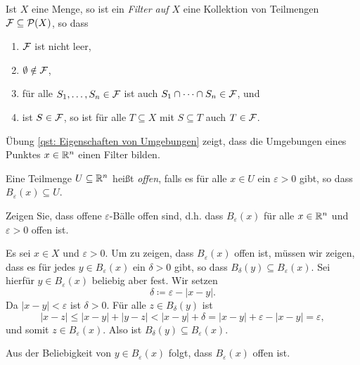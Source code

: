 \documentclass[a4paper,10pt]{article}
\begin{document}
\begin{bem}
 Ist $X$ eine Menge, so ist ein \emph{Filter auf $X$} eine Kollektion von Teilmengen $\mathcal{F} \subseteq \mathcal{P}(X)$, so dass
 \begin{enumerate}
  \item
   $\mathcal{F}$ ist nicht leer,
  \item
   $\emptyset \notin \mathcal{F}$,
  \item
   für alle $S_1, \dotsc, S_n \in \mathcal{F}$ ist auch $S_1 \cap \dotsb \cap S_n \in \mathcal{F}$, und
  \item
   ist $S \in \mathcal{F}$, so ist für alle $T \subseteq X$ mit $S \subseteq T$ auch $T \in \mathcal{F}$.
 \end{enumerate}
 Übung \ref{qst: Eigenschaften von Umgebungen} zeigt, dass die Umgebungen eines Punktes $x \in \mathbb{R}^n$ einen Filter bilden.
\end{bem}



\begin{defi}
 Eine Teilmenge $U \subseteq \mathbb{R}^n$ heißt \emph{offen}, falls es für alle $x \in U$ ein $\varepsilon > 0$ gibt, so dass $B_\varepsilon(x) \subseteq U$.
\end{defi}


\begin{question}
 Zeigen Sie, dass offene $\varepsilon$-Bälle offen sind, d.h. dass $B_\varepsilon(x)$ für alle $x \in \mathbb{R}^n$ und $\varepsilon > 0$ offen ist.
\end{question}
\begin{solution}
 Es sei $x \in X$ und $\varepsilon > 0$. Um zu zeigen, dass $B_\varepsilon(x)$ offen ist, müssen wir zeigen, dass es für jedes $y \in B_\varepsilon(x)$ ein $\delta > 0$ gibt, so dass $B_\delta(y) \subseteq B_\varepsilon(x)$. Sei hierfür $y \in B_\varepsilon(x)$ beliebig aber fest. Wir setzen
 \[
  \delta \coloneqq \varepsilon - |x-y|.
 \]
 Da $|x-y| < \varepsilon$ ist $\delta > 0$. Für alle $z \in B_\delta(y)$ ist
 \[
  |x-z|
  \leq |x-y| + |y-z|
  < |x-y| + \delta
  = |x-y| + \varepsilon - |x-y|
  = \varepsilon,
 \]
 und somit $z \in B_\varepsilon(x)$. Also ist $B_\delta(y) \subseteq B_\varepsilon(x)$. 
 \begin{center}
 \end{center}
 Aus der Beliebigkeit von $y \in B_\varepsilon(x)$ folgt, dass $B_\varepsilon(x)$ offen ist.
\end{solution}
\end{document}

